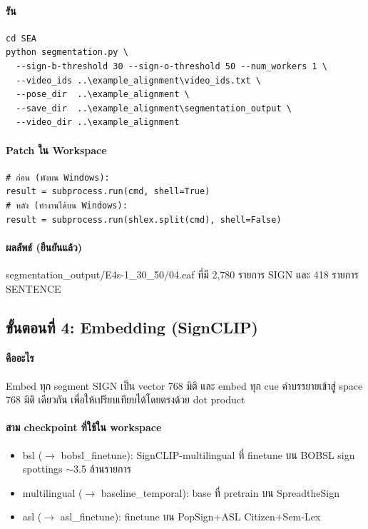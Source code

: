 \documentclass[11pt,a4paper]{article}
\def\texttt#1{#1}%
\def\textbf#1{#1}%
\def\emph#1{#1}%
\begin{document}
\paragraph{รัน}
\begin{lstlisting}
cd SEA
python segmentation.py \
  --sign-b-threshold 30 --sign-o-threshold 50 --num_workers 1 \
  --video_ids ..\example_alignment\video_ids.txt \
  --pose_dir  ..\example_alignment \
  --save_dir  ..\example_alignment\segmentation_output \
  --video_dir ..\example_alignment
\end{lstlisting}

\paragraph{Patch ใน Workspace}
\begin{lstlisting}
# ก่อน (พังบน Windows):
result = subprocess.run(cmd, shell=True)
# หลัง (ทำงานได้บน Windows):
result = subprocess.run(shlex.split(cmd), shell=False)
\end{lstlisting}

\paragraph{ผลลัพธ์ (ยืนยันแล้ว)}
\texttt{segmentation\_output/E4s-1\_30\_50/04.eaf} ที่มี
\textbf{2,780} รายการ \texttt{SIGN} และ \textbf{418} รายการ \texttt{SENTENCE}


\subsection{ขั้นตอนที่ 4: Embedding (SignCLIP)}
\label{sec:step4}

\paragraph{คืออะไร}
Embed ทุก segment \texttt{SIGN} เป็น vector 768 มิติ
และ embed ทุก cue คำบรรยายเข้าสู่ space 768 มิติ \emph{เดียวกัน}
เพื่อให้เปรียบเทียบได้โดยตรงด้วย dot product

\paragraph{สาม checkpoint ที่ใช้ใน workspace}
\begin{itemize}[leftmargin=1.5em]
  \item \texttt{bsl} ($\to$ \texttt{bobsl\_finetune}): SignCLIP-multilingual
        ที่ finetune บน BOBSL sign spottings $\sim$3.5 ล้านรายการ
  \item \texttt{multilingual} ($\to$ \texttt{baseline\_temporal}):
        base ที่ pretrain บน SpreadtheSign
  \item \texttt{asl} ($\to$ \texttt{asl\_finetune}): finetune บน PopSign+ASL Citizen+Sem-Lex
\end{itemize}
\end{document}
